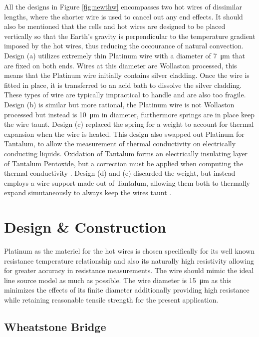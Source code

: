 \documentclass[12pt,MEng]{UoAThesis}
\begin{document}
All the designs in Figure \ref{fig:newthw} encompasses two hot wires of dissimilar lengths, where the shorter wire is used to cancel out any end effects. It should also be mentioned that the cells and hot wires are designed to be placed vertically so that the Earth's gravity is perpendicular to the temperature gradient imposed by the hot wires, thus reducing the occourance of natural convection. Design (a) utilizes extremely thin Platinum wire with a diameter of \SI{7}{\micro\meter} that are fixed on both ends. Wires at this diameter are Wollaston processed, this means that the Platinum wire initially contains silver cladding. Once the wire is fitted in place, it is transferred to an acid bath to dissolve the silver cladding. These types of wire are typically impractical to handle and are also too fragile. Design (b) is similar but more rational, the Platinum wire is not Wollaston processed but instead is \SI{10}{\micro\meter} in diameter, furthermore springs are in place keep the wire taunt. Design (c) replaced the spring for a weight to account for thermal expansion when the wire is heated. This design also swapped out Platinum for Tantalum, to allow the  measurement of thermal conductivity on electrically conducting liquids. Oxidation of Tantalum forms an electrically insulating layer of Tantalum Pentoxide, but a correction must be applied when computing the thermal conductivity \cite{elec}. Design (d) and (e) discarded the weight, but instead employs a wire support made out of Tantalum, allowing them both to thermally expand simutaneously to always keep the wires taunt \cite{history2}.
 

\section{Design \& Construction}
Platinum as the materiel for the hot wires is chosen specifically for its well known resistance temperature relationship and also its naturally high resistivity allowing for greater accuracy in resistance measurements. The wire should mimic the ideal line source model as much as possible. The wire diameter is \SI{15}{\micro\meter} as this minimizes the effects of its finite diameter additionally providing high resistance while retaining reasonable tensile strength for the present application.

\subsection{Wheatstone Bridge}
\end{document}
